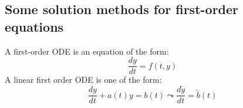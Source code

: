 \documentclass[main.tex]{subfiles}
\begin{document}
\subsection{Some solution methods for first-order equations}
\par A first-order ODE is an equation of the form: 
\begin{equation}
    \dfrac{dy}{dt} = f(t,y)
\end{equation}
A linear first order ODE is one of the form: 
\begin{equation}
    \dfrac{dy}{dt} + a(t)y = b(t) \leadsto \dfrac{d \tilde{y}}{dt} = \tilde{b}(t)
\end{equation}
\end{document}
